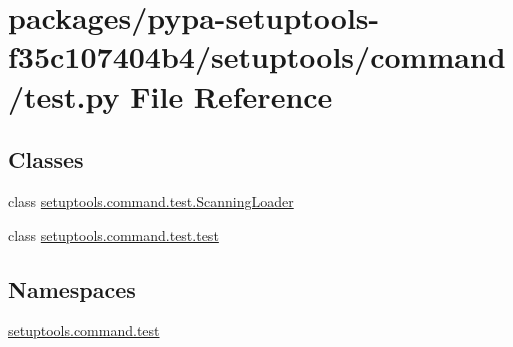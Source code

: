 \hypertarget{pypa-setuptools-f35c107404b4_2setuptools_2command_2test_8py}{}\section{packages/pypa-\/setuptools-\/f35c107404b4/setuptools/command/test.py File Reference}
\label{pypa-setuptools-f35c107404b4_2setuptools_2command_2test_8py}
\subsection*{Classes}
\begin{DoxyCompactItemize}
\item 
class \hyperlink{classsetuptools_1_1command_1_1test_1_1ScanningLoader}{setuptools.\+command.\+test.\+Scanning\+Loader}
\item 
class \hyperlink{classsetuptools_1_1command_1_1test_1_1test}{setuptools.\+command.\+test.\+test}
\end{DoxyCompactItemize}
\subsection*{Namespaces}
\begin{DoxyCompactItemize}
\item 
 \hyperlink{namespacesetuptools_1_1command_1_1test}{setuptools.\+command.\+test}
\end{DoxyCompactItemize}
